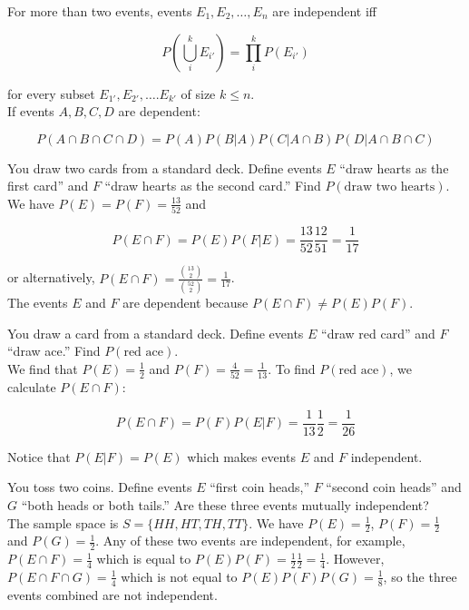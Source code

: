 \documentclass[12pt, a4paper]{article}
\newcounter{exa}
\begin{document}
For more than two events, events $E_1, E_2, \dots, E_n$ are independent iff

$$P\left(\bigcup_i^k E_{i'} \right) = \prod_i^k P(E_{i'})$$

for every subset $E_{1'}, E_{2'}, \dots. E_{k'}$ of size $k\le n$. \\

If events $A,B,C,D$ are dependent:

$$P(A\cap B\cap C\cap D) = P(A)P(B|A)P(C|A\cap B)P(D|A\cap B\cap C)$$

\begin{texample}
You draw two cards from a standard deck. Define events $E$ ``draw hearts as the first card'' and $F$ ``draw hearts as the second card.'' Find $P(\text{draw two hearts})$. \\

We have $P(E)=P(F)=\frac{13}{52}$ and

$$P(E \cap F)=P(E)P(F|E)=\frac{13}{52}\frac{12}{51}=\frac{1}{17}$$

or alternatively, $P(E \cap F)=\frac{{13 \choose 2}}{{52 \choose 2}}=\frac{1}{17}$. \\

The events $E$ and $F$ are dependent because $P(E \cap F) \ne P(E)P(F)$.
\end{texample}

\begin{texample}
You draw a card from a standard deck. Define events $E$ ``draw red card'' and $F$ ``draw ace.'' Find $P(\text{red ace})$. \\

We find that $P(E)=\frac{1}{2}$ and $P(F)=\frac{4}{52}=\frac{1}{13}$. To find $P(\text{red ace})$, we calculate $P(E \cap F)$:

$$P(E \cap F)=P(F)P(E|F)=\frac{1}{13}\frac{1}{2}=\frac{1}{26}$$

Notice that $P(E|F)=P(E)$ which makes events $E$ and $F$ independent.
\end{texample}

\begin{texample}
You toss two coins. Define events $E$ ``first coin heads,'' $F$ ``second coin heads'' and $G$ ``both heads or both tails.'' Are these three events mutually independent? \\

The sample space is $S=\{HH, HT, TH, TT\}$. We have $P(E)=\frac12$, $P(F)=\frac12$ and $P(G)=\frac12$. Any of these two events are independent, for example, $P(E\cap F)=\frac14$ which is equal to $P(E)P(F)=\frac12\frac12=\frac14$. However, $P(E \cap F \cap G)=\frac14$ which is not equal to $P(E)P(F)P(G)=\frac18$, so the three events combined are not independent.
\end{texample}
\end{document}
